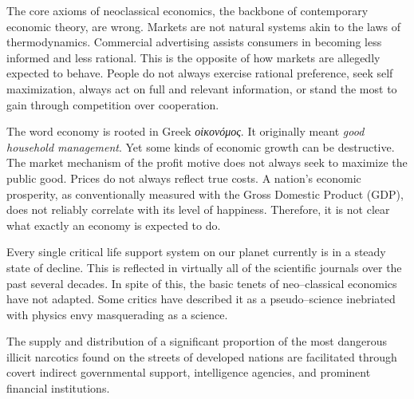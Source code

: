 
The core axioms of neoclassical economics, the backbone of contemporary economic theory, are wrong. Markets are not natural systems akin to the laws of thermodynamics.
\footnotecite[lasn2012]
Commercial advertising assists consumers in becoming less informed and less rational. This is the opposite of how markets are allegedly expected to behave. People do not always exercise rational preference, seek self maximization, always act on full and relevant information, 
or stand the most to gain through competition over cooperation.

The word economy is rooted in Greek {\it οἰκονόμος}. It originally meant {\it good household management}. Yet some kinds of economic growth can be destructive.
\footnotecite[h2oil]
The market mechanism of the profit motive does not always seek to maximize the public good.
Prices do not always reflect true costs.
\footnotecite[roberts2013]
\footnotecite[cobb1999]
\footnotecite[oxfam2004]
\footnotecite[raj2010]
\footnotecite[extras={ See sections 4.6 and 4.11.}][agenda_21]
A nation's economic prosperity, as conventionally measured with the Gross Domestic Product (GDP), does not reliably correlate with its level of happiness.
 Therefore, it is not clear what exactly an economy is expected to do.

Every single critical life support system on our planet currently is in a steady state of decline. This is reflected in virtually all of the scientific journals over the past several decades. In spite of this, the basic tenets of neo--classical economics have not adapted. Some critics have described it as a pseudo--science inebriated with physics envy masquerading as a science.


The supply and distribution of a significant proportion of the most dangerous illicit narcotics found on the streets of developed nations are facilitated through covert indirect governmental support, intelligence agencies, and prominent financial institutions.
\footnotecite[webb1996]


